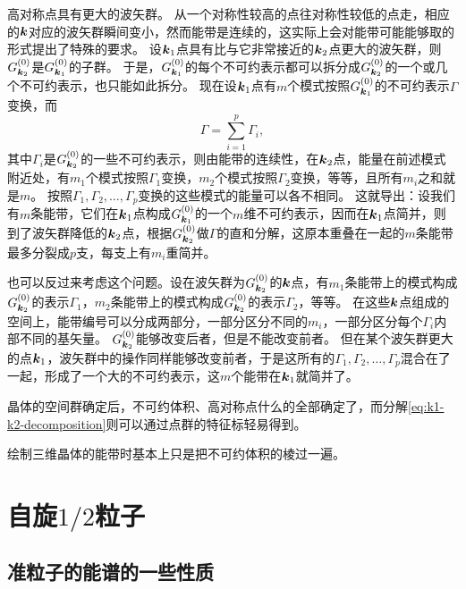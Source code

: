 高对称点具有更大的波矢群。
从一个对称性较高的点往对称性较低的点走，相应的$\vb*{k}$对应的波矢群瞬间变小，然而能带是连续的，这实际上会对能带可能能够取的形式提出了特殊的要求。
设$\vb*{k}_1$点具有比与它非常接近的$\vb*{k}_2$点更大的波矢群，则$G_{\vb*{k}_2}^{(0)}$是$G_{\vb*{k}_1}^{(0)}$的子群。
于是，$G_{\vb*{k}_1}^{(0)}$的每个不可约表示都可以拆分成$G_{\vb*{k}_2}^{(0)}$的一个或几个不可约表示，也只能如此拆分。
现在设$\vb*{k}_1$点有$m$个模式按照$G_{\vb*{k}_1}^{(0)}$的不可约表示$\Gamma$变换，而
\begin{equation}
    \Gamma = \sum_{i=1}^p \Gamma_i,
    \label{eq:k1-k2-decomposition}
\end{equation}
其中$\Gamma_i$是$G_{\vb*{k}_2}^{(0)}$的一些不可约表示，则由能带的连续性，在$\vb*{k}_2$点，能量在前述模式附近处，有$m_1$个模式按照$\Gamma_1$变换，$m_2$个模式按照$\Gamma_2$变换，等等，且所有$m_i$之和就是$m$。
按照$\Gamma_1, \Gamma_2, \ldots, \Gamma_p$变换的这些模式的能量可以各不相同。
这就导出：设我们有$m$条能带，它们在$\vb*{k}_1$点构成$G_{\vb*{k}_1}^{(0)}$的一个$m$维不可约表示，因而在$\vb*{k}_1$点简并，则到了波矢群降低的$\vb*{k}_2$点，根据$G_{\vb*{k}_2}^{(0)}$做$\Gamma$的直和分解，这原本重叠在一起的$m$条能带最多分裂成$p$支，每支上有$m_i$重简并。

也可以反过来考虑这个问题。设在波矢群为$G_{\vb*{k}_2}^{(0)}$的$\vb*{k}$点，有$m_1$条能带上的模式构成$G_{\vb*{k}_2}^{(0)}$的表示$\Gamma_1$，$m_2$条能带上的模式构成$G_{\vb*{k}_2}^{(0)}$的表示$\Gamma_2$，等等。
在这些$\vb*{k}$点组成的空间上，能带编号可以分成两部分，一部分区分不同的$m_i$，一部分区分每个$\Gamma_i$内部不同的基矢量。
$G_{\vb*{k}_2}^{(0)}$能够改变后者，但是不能改变前者。
但在某个波矢群更大的点$\vb*{k}_1$，波矢群中的操作同样能够改变前者，于是这所有的$\Gamma_1, \Gamma_2, \ldots, \Gamma_p$混合在了一起，形成了一个大的不可约表示，这$m$个能带在$\vb*{k}_1$就简并了。

晶体的空间群确定后，不可约体积、高对称点什么的全部确定了，而分解\eqref{eq:k1-k2-decomposition}则可以通过点群的特征标轻易得到。

绘制三维晶体的能带时基本上只是把不可约体积的棱过一遍。

\section{自旋$1/2$粒子}

\subsection{准粒子的能谱的一些性质}

